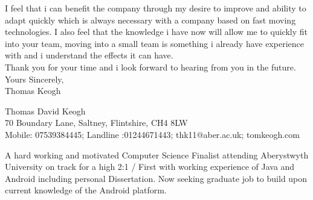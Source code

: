 \documentclass[10pt,a4paper]{article}
\begin{document}
\noindent
I feel that i can benefit the company through my desire to improve and ability to adapt quickly which is always necessary with a company based on fast moving technologies. I also feel that the knowledge i have now will allow me to quickly fit into your team, moving into a small team is something i already have experience with and i understand the effects it can have. \\

\noindent
Thank you for your time and i look forward to hearing from you in the future.\\

\noindent
Yours Sincerely,\\

Thomas Keogh




















\newpage
\begin{center}
\huge
Thomas David Keogh\\
\normalsize
\vspace{0.1cm}
70 Boundary Lane, Saltney, Flintshire, CH4 8LW\\
Mobile: 07539384445; Landline :01244671443; thk11@aber.ac.uk; tomkeogh.com
\end{center}



\noindent
A hard working and motivated Computer Science Finalist attending Aberystwyth University on track for a high 2:1 / First with working experience of Java and Android including personal Dissertation. Now seeking graduate job to build upon current knowledge of the Android platform.\\
\end{document}
